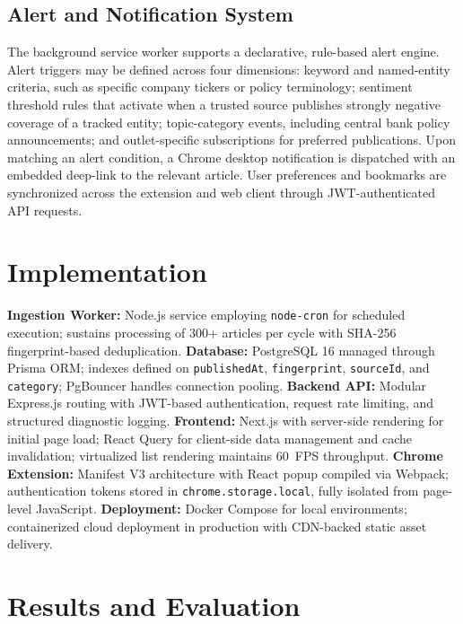 \documentclass[conference]{IEEEtran}
\begin{document}
\subsection{Alert and Notification System}
The background service worker supports a declarative, rule-based alert engine. Alert triggers may be defined across four dimensions: keyword and named-entity criteria, such as specific company tickers or policy terminology; sentiment threshold rules that activate when a trusted source publishes strongly negative coverage of a tracked entity; topic-category events, including central bank policy announcements; and outlet-specific subscriptions for preferred publications. Upon matching an alert condition, a Chrome desktop notification is dispatched with an embedded deep-link to the relevant article. User preferences and bookmarks are synchronized across the extension and web client through JWT-authenticated API requests.

\section{Implementation}

\textbf{Ingestion Worker:} Node.js service employing \texttt{node-cron} for scheduled execution; sustains processing of 300+ articles per cycle with SHA-256 fingerprint-based deduplication. \textbf{Database:} PostgreSQL 16 managed through Prisma ORM; indexes defined on \texttt{publishedAt}, \texttt{fingerprint}, \texttt{sourceId}, and \texttt{category}; PgBouncer handles connection pooling. \textbf{Backend API:} Modular Express.js routing with JWT-based authentication, request rate limiting, and structured diagnostic logging. \textbf{Frontend:} Next.js with server-side rendering for initial page load; React Query for client-side data management and cache invalidation; virtualized list rendering maintains 60~FPS throughput. \textbf{Chrome Extension:} Manifest V3 architecture with React popup compiled via Webpack; authentication tokens stored in \texttt{chrome.storage.local}, fully isolated from page-level JavaScript. \textbf{Deployment:} Docker Compose for local environments; containerized cloud deployment in production with CDN-backed static asset delivery.

\section{Results and Evaluation}
\end{document}

